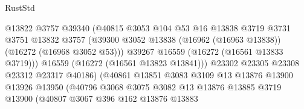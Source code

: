 \begin{lexlean}{RustStd}
\begin{coremodule}
                                        @13822
                                        @3757
                                        @39340
                                        (@40815
                                          @3053
                                          @104
                                          @53
                                          @16
                                          @13838
                                          @3719
                                          @3731
                                          @3751
                                          @13832
                                          @3757
                                          (@39300
                                            @3052
                                            @13838
                                            (@16962 (@16963 @13838))
                                            (@16272 (@16968 @3052 @53)))
                                          @39267
                                          @16559
                                          (@16272 (@16561 @13833 @3719)))
                                        @16559
                                        (@16272 (@16561 @13823 @13841)))
                                      @23302
                                      @23305
                                      @23308
                                      @23312
                                      @23317
                                      @40186)
                                    (@40861
                                      @13851
                                      @3083
                                      @3109
                                      @13
                                      @13876
                                      @13900
                                      @13926
                                      @13950
                                      (@40796
                                        @3068
                                        @3075
                                        @3082
                                        @13
                                        @13876
                                        @13885
                                        @3719
                                        @13900
                                        (@40807
                                          @3067
                                          @396
                                          @162
                                          @13876
                                          @13883

\end{coremodule}
\end{lexlean}
